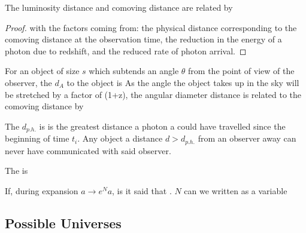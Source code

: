 \documentclass{article}
\begin{document}
 \begin{prop}
 The luminosity distance and comoving distance are related by 
 \end{prop}
\begin{proof}
with the factors coming from: the physical distance corresponding to the comoving distance at the observation time, the reduction in the energy of a photon due to redshift, and the reduced rate of photon arrival. 
\end{proof}

\begin{definition}
For an object of size $s$ which subtends an angle $\theta$ from the point of view of the observer, the  $d_A$ to the object is 
As the angle the object takes up in the sky will be stretched by a factor of (1+z), the angular diameter distance is related to the comoving distance by 
\end{definition}

\begin{definition}
The  $d_{p.h.}$ is is the greatest distance a photon a could have travelled since the beginning of time $t_i$. Any object a distance $d>d_{p.h.}$ from an observer away can never have communicated with said observer. 
\end{definition}

\begin{definition}
The  is 
\end{definition}

\begin{definition}[e-folds]
If, during expansion $a \to e^N a$, is it said that . $N$ can we written as a variable 
\end{definition}

\subsection{Possible Universes}
\end{document}

